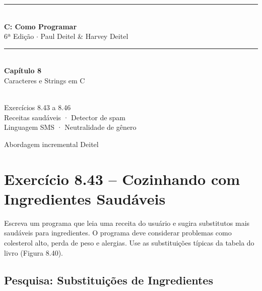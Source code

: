 \documentclass[12pt,a4paper]{article}
\begin{document}
\begin{titlepage}
  \centering\vspace*{2cm}
  {\color{deitelblue}\rule{\linewidth}{2pt}}\\[0.4cm]
  {\huge\bfseries\color{deitelblue}C: Como Programar}\\[0.2cm]
  {\large\color{deitelblue}6ª Edição $\cdot$ Paul Deitel \& Harvey Deitel}\\[0.2cm]
  {\color{deitelblue}\rule{\linewidth}{2pt}}\\[1cm]
  {\LARGE\bfseries Capítulo 8}\\[0.3cm]
  {\Large\color{deitelblue!80}Caracteres e Strings em C}\\[0.8cm]
  \begin{tcolorbox}[colback=ecolightgreen,colframe=ecogreen,width=0.85\linewidth]
    \\[0.3cm]
    {\normalsize Exercícios 8.43 a 8.46\\[0.2cm]
    Receitas saudáveis · Detector de spam\\
    Linguagem SMS · Neutralidade de gênero}
  \end{tcolorbox}
  \vfill{\small Abordagem incremental Deitel}
\end{titlepage}

\tableofcontents\newpage

\section{Exercício 8.43 -- Cozinhando com Ingredientes Saudáveis}

\begin{enunciadoBox}[Enunciado 8.43]
Escreva um programa que leia uma receita do usuário e sugira substitutos mais
saudáveis para ingredientes. O programa deve considerar problemas como colesterol
alto, perda de peso e alergias. Use as substituições típicas da tabela do livro
(Figura 8.40).
\end{enunciadoBox}

\subsection*{Pesquisa: Substituições de Ingredientes}
\end{document}
